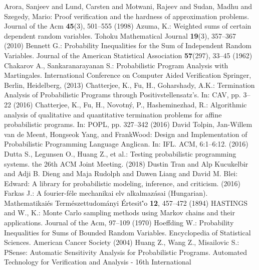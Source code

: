 \documentclass[runningheads]{llncs}
\begin{document}
%
%
%
% 
% 
%
\begin{thebibliography}{8}
Arora, Sanjeev and Lund, Carsten and Motwani, Rajeev and Sudan, Madhu and Szegedy, Mario: Proof verification and the hardness of approximation problems. Journal of the Acm \textbf{45}(3), 501--555 (1998)
Azuma, K.: Weighted sums of certain dependent random variables. Tohoku Mathematical Journal \textbf{19}(3), 357--367 (2010)
Bennett G.: Probability Inequalities for the Sum of Independent Random Variables. Journal of the American Statistical Association \textbf{57}(297), 33--45 (1962)
Chakarov A., Sankaranarayanan S.: Probabilistic Program Analysis with Martingales. International Conference on Computer Aided Verification Springer, Berlin, Heidelberg, (2013)
Chatterjee, K., Fu, H., Goharshady, A.K.: Termination Analysis of Probabilistic Programs through Positivstellensatz's. In: CAV, pp. 3--22 (2016)
Chatterjee, K., Fu, H., Novotn\'{y}, P., Hasheminezhad, R.: Algorithmic analysis of
qualitative and quantitative termination problems for affine probabilistic programs. In: POPL, pp. 327--342 (2016)
David Tolpin, Jan-Willem van de Meent, Hongseok Yang, and FrankWood: Design and Implementation of Probabilistic Programming Language Anglican. In: IFL. ACM, 6:1–6:12. (2016)
Dutta S., Legunsen O., Huang Z., et al.: Testing probabilistic programming systems. the 26th ACM Joint Meeting. (2018)
Dustin Tran and Alp Kucukelbir and Adji B. Dieng and Maja Rudolph and Dawen Liang and David M. Blei: Edward: A library for probabilistic modeling, inference, and criticism. (2016) 
Farkas J.: A fourier-f\'{e}le mechanikai elv alkalmaz\'{a}sai (Hungarian). Mathematikai\'{e}s Term\'{e}szettudom\'{a}nyi \'{E}rtesit\''{o} \textbf{12}, 457--472 (1894)
HASTINGS and W., K.: Monte Carlo sampling methods using Markov chains and their applications. Journal of the Acm, 97--109 (1970)
Hoeffding W.: Probability Inequalities for Sums of Bounded Random Variables. Encyclopedia of Statistical Sciences. American Cancer Society (2004)
Huang Z., Wang Z., Misailovic S.: PSense: Automatic Sensitivity Analysis for Probabilistic Programs. Automated Technology for Verification and Analysis - 16th International

\end{thebibliography}
\end{document}
